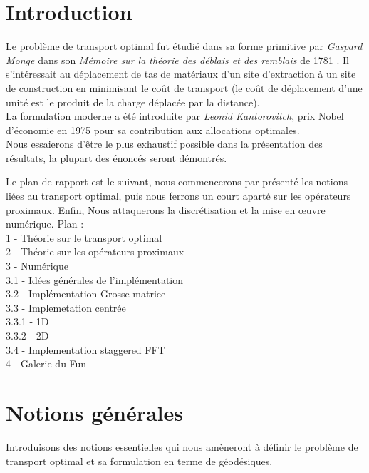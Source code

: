 \documentclass[a4paper,12pt]{article}
\title{\titre }
\author{\auteur}
\date{\dateDoc}
\begin{document}
\thispagestyle{empty}
\maketitle
\tableofcontents
\newpage
\section{Introduction}
Le problème de transport optimal fut étudié dans sa forme primitive par \emph{Gaspard Monge} dans son \emph{Mémoire sur la théorie des déblais et des remblais} de 1781 \cite{monge}. Il s'intéressait au déplacement de tas de matériaux d'un site d'extraction à un site de construction en minimisant le coût de transport (le coût de déplacement d'une unité est le produit de la charge déplacée par la distance). \\
La formulation moderne a été introduite par \emph{Leonid Kantorovitch}, prix Nobel d'économie en 1975 pour sa contribution aux allocations optimales.  \\


Nous essaierons d'être le plus exhaustif possible dans la présentation des résultats, la plupart des énoncés seront démontrés. 



Le plan de rapport est le suivant, nous commencerons par présenté les notions liées au transport optimal, puis nous ferrons un court aparté sur les opérateurs proximaux. Enfin, Nous attaquerons la discrétisation et la mise en œuvre numérique. 
{\Huge Plan : \\
1 - Théorie sur le transport optimal \\
2 - Théorie sur les opérateurs proximaux  \\
3 - Numérique \\
	3.1 - Idées générales de l'implémentation \\
	3.2 - Implémentation Grosse matrice \\
	3.3 - Implemetation centrée \\
		3.3.1 - 1D \\
		3.3.2 - 2D \\
	3.4 - Implementation staggered FFT \\
4 - Galerie du Fun \\

}
\newpage

\section{Notions générales}
Introduisons des notions essentielles qui nous amèneront à définir le problème de transport optimal et sa formulation en terme de géodésiques. 
\end{document}
